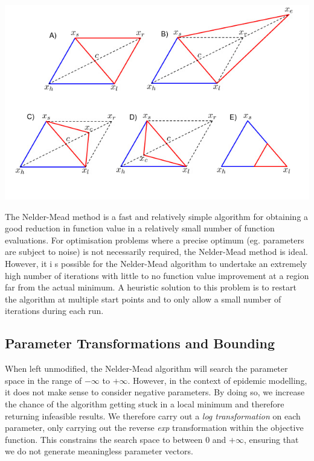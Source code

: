 \begin{framed}
\begin{center}
  \includegraphics[width=15cm]{nelder.png}
\end{center}

The Nelder-Mead method is a fast and relatively simple
algorithm for obtaining a good reduction in function value in a
relatively small number of function evaluations. For optimisation
problems where a precise optimum (eg. parameters are subject to noise)
is not necessarily required, the Nelder-Mead method is ideal. However,
it i s possible for the
Nelder-Mead algorithm to undertake an extremely high number of
iterations with little to no function value improvement at a region
far from the actual minimum. A heuristic solution to this problem is
to restart the algorithm at multiple start points and to only allow a
small number of iterations during each run.\cite{nelder,singer}
 
\end{framed}


\subsection{Parameter Transformations and Bounding}
When left unmodified, the Nelder-Mead algorithm will search the parameter
space in the range of $-\infty$ to $+\infty$. However, in the context
of epidemic modelling, it does not make sense to consider negative
parameters. By doing so, we increase the chance of the algorithm
getting stuck in a local minimum and therefore returning infeasible results. We therefore carry out a \emph{log transformation} on each
parameter, only carrying out the reverse \emph{exp} transformation
within the objective function. This constrains the search space to
between $0$ and $+\infty$, ensuring that we do not generate
meaningless parameter vectors. 

